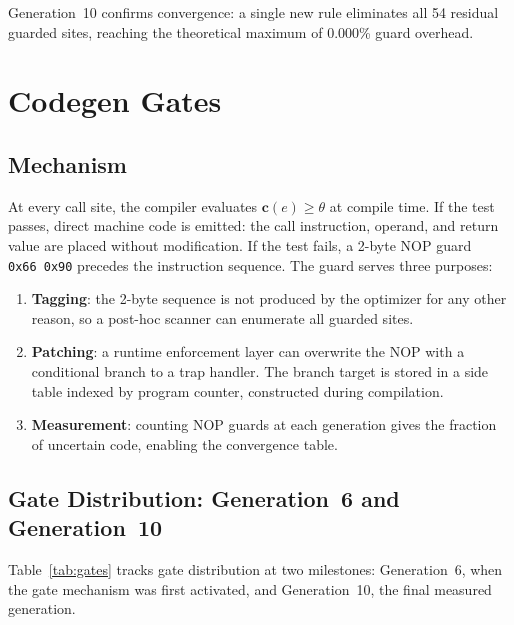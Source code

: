 \documentclass[acmsmall,screen,review,anonymous]{acmart}
\newcommand{\conf}[1]{\mathbf{c}(#1)}
\begin{document}
Generation~10 confirms convergence: a single new rule eliminates all 54
residual guarded sites, reaching the theoretical maximum of 0.000\%
guard overhead.

\section{Codegen Gates}
\label{sec:gates}

\subsection{Mechanism}

At every call site, the compiler evaluates $\conf{e} \geq \theta$ at
compile time.
If the test passes, direct machine code is emitted: the call instruction,
operand, and return value are placed without modification.
If the test fails, a 2-byte NOP guard \texttt{0x66~0x90} precedes the
instruction sequence.
The guard serves three purposes:

\begin{enumerate}
\item \textbf{Tagging}: the 2-byte sequence is not produced by the
  optimizer for any other reason, so a post-hoc scanner can enumerate
  all guarded sites.
\item \textbf{Patching}: a runtime enforcement layer can overwrite the
  NOP with a conditional branch to a trap handler.
  The branch target is stored in a side table indexed by program counter,
  constructed during compilation.
\item \textbf{Measurement}: counting NOP guards at each generation gives
  the fraction of uncertain code, enabling the convergence table.
\end{enumerate}

\subsection{Gate Distribution: Generation~6 and Generation~10}

Table~\ref{tab:gates} tracks gate distribution at two milestones:
Generation~6, when the gate mechanism was first activated, and
Generation~10, the final measured generation.
\end{document}
